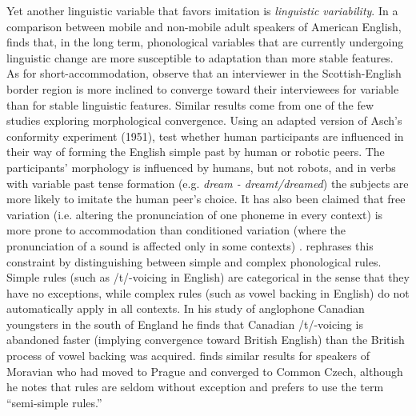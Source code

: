 \documentclass[output=paper,
modfonts
]{langscibook}
\begin{document}
Yet another linguistic variable that favors imitation is \textit{linguistic variability}. In a comparison between mobile and non-mobile adult speakers of American English, \citet{bowie_effect_2000} finds that, in the long term, phonological variables that are currently undergoing linguistic change are more susceptible to adaptation than more stable features. As for short-accommodation, \citet{watt_levels_2010} observe that an interviewer in the Scottish-English border region is more inclined to converge toward their interviewees for variable than for stable linguistic features. Similar results come from one of the few studies exploring morphological convergence. Using an adapted version of Asch's conformity experiment (1951), \citet{beckner_participants_2016} test whether human participants are influenced in their way of forming the English simple past by human or robotic peers. The participants' morphology is influenced by humans, but not robots, and in verbs with variable past tense formation (e.g. \textit{dream - dreamt/dreamed}) the subjects are more likely to imitate the human peer's choice.
It has also been claimed that free variation  (i.e. altering the pronunciation of one phoneme in every context) is more prone to accommodation than conditioned variation (where the pronunciation of a sound is affected only in some contexts) \citep{trudgill_dialects_1986,siegel_second_2010}. \cite{chambers_dialect_1992} rephrases this constraint by distinguishing between simple and complex phonological rules. Simple rules (such as /t/-voicing in English) are categorical in the sense that they have no exceptions, while complex rules (such as vowel backing in English) do not automatically apply in all contexts. In his study of anglophone Canadian youngsters in the south of England he finds that Canadian /t/-voicing is abandoned faster (implying convergence toward British English) than the British process of vowel backing was acquired. \cite{wilson_types_2011} finds similar results for speakers of Moravian who had moved to Prague and converged to Common Czech, although he notes that rules are seldom without exception and prefers to use the term ``semi-simple rules.''
% 
% 
% 
\end{document}
